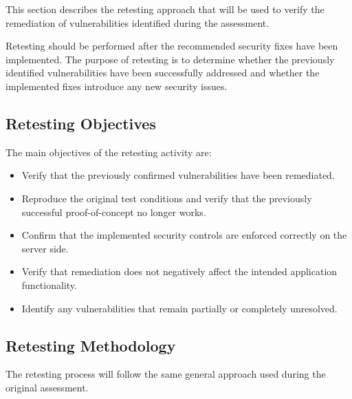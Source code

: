 This section describes the retesting approach that will be used to
verify the remediation of vulnerabilities identified during the
assessment.

Retesting should be performed after the recommended security fixes
have been implemented. The purpose of retesting is to determine
whether the previously identified vulnerabilities have been
successfully addressed and whether the implemented fixes introduce
any new security issues.

\subsection*{Retesting Objectives}

The main objectives of the retesting activity are:

\begin{itemize}

    \item Verify that the previously confirmed vulnerabilities have
    been remediated.

    \item Reproduce the original test conditions and verify that the
    previously successful proof-of-concept no longer works.

    \item Confirm that the implemented security controls are enforced
    correctly on the server side.

    \item Verify that remediation does not negatively affect the
    intended application functionality.

    \item Identify any vulnerabilities that remain partially or
    completely unresolved.

\end{itemize}

\subsection*{Retesting Methodology}

The retesting process will follow the same general approach used
during the original assessment.

